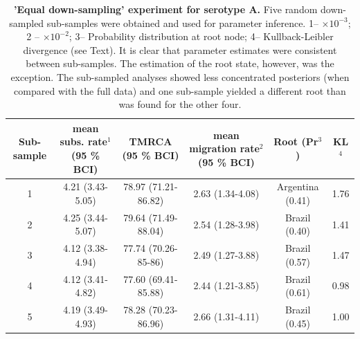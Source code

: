 \documentclass[a4paper,10pt]{article}
\begin{document}
\newpage
\begin{table}
\medskip
\begin{minipage}{\textwidth} 
\begin{center}
\caption{ {{\bf 'Equal down-sampling' experiment for serotype A.}} 
Five random down-sampled sub-samples were obtained and used for parameter inference.
1-- $\times 10^{-3}$; 2 -- $\times 10^{-2}$; 3-- Probability distribution at root node; 4-- Kullback-Leibler divergence (see Text).
It is clear that parameter estimates were consistent between sub-samples.
The estimation of the root state, however, was the exception.
The sub-sampled analyses showed less concentrated posteriors (when compared with the full data) and one sub-sample yielded a different root than was found for the other four. 
}
\begin{tabular}{cccccc}
\toprule
Sub-sample	&mean subs. rate$^{1}$ (95 \% BCI)	&TMRCA (95 \% BCI)	&mean migration rate$^{2}$  (95 \% BCI)	&Root (Pr$^{3}$)& KL$^4$\\
\midrule
1	&4.21 (3.43-5.05)	&78.97 (71.21-86.82)	&2.63 (1.34-4.08)	&Argentina (0.41)& 1.76\\
2	&4.25 (3.44-5.07)	&79.64 (71.49-88.04)	&2.54 (1.28-3.98)	&Brazil (0.40)& 1.41\\
3	&4.12 (3.38-4.94)	&77.74 (70.26-85-86)	&2.49 (1.27-3.88)	&Brazil (0.57)&1.47\\
4	&4.12 (3.41-4.82)	&77.60 (69.41-85.88)	&2.44 (1.21-3.85)	&Brazil (0.61)&0.98\\
5	&4.19 (3.49-4.93)	&78.28 (70.23-86.96)	&2.66 (1.31-4.11)	&Brazil (0.45)& 1.00\\
\bottomrule
\end{tabular}
\label{stab:ED_A}
\end{center}
\end{minipage}
\end{table}
\end{document}
